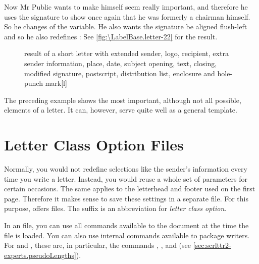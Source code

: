 \begin{Example}
  Now Mr Public wants to make himself seem really important, and therefore he uses the
  signature to show once again that he was formerly a chairman himself. So
  he changes  of the
   variable. He also wants the signature
  be aligned flush-left and so he also redefines :%
  See \autoref{fig:\LabelBase.letter-22} for the result.
  \begin{figure}
    \setcapindent{0pt}%
    \begin{captionbeside}
      {result of a short letter with extended sender, logo, recipient,
        extra sender information, place, date, subject opening, text,
        closing, modified signature, postscript, distribution list, enclosure
        and hole-punch mark}[l]
    \end{captionbeside}
    \label{fig:\LabelBase.letter-22}
  \end{figure}
\end{Example}

\iftrue%
  The preceding example shows the most important, although not all possible,
  elements of a letter. It can, however, serve quite well as a general
  template.%
\fi
%
\EndIndexGroup
%
\EndIndexGroup


\section{Letter Class Option Files}
%
\BeginIndexGroup
{}%
%

Normally, you would not redefine selections like the sender's information
every time you write a letter. Instead, you would reuse a whole set of
parameters for certain occasions. The same applies to the letterhead
and footer used on the first page. Therefore it makes sense to save these
settings in a separate file. For this purpose, \KOMAScript{} offers
 files. The  suffix is an abbreviation for
\emph{\emph{l}etter \emph{c}lass \emph{o}ption}.

In an  file, you can use all commands available to the document at
the time the  file is loaded. You can also use internal commands
available to package writers. For  and ,
these are, in particular, the commands
,
, and
 (see
\autoref{sec:scrlttr2-experts.pseudoLengths}).

